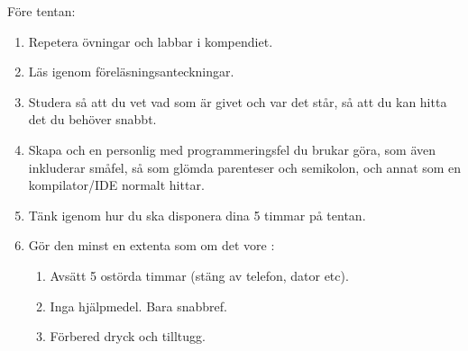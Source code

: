 

\begin{Slide}{Före tentan:}\SlideFontSmall
\begin{enumerate}
\item Repetera övningar och labbar i kompendiet. 
\pause\item Läs igenom föreläsningsanteckningar.
\pause\item Studera   så att du vet vad som är givet och var det står, så att du kan hitta det du behöver snabbt.
\pause\item Skapa och  en personlig  med programmeringsfel du brukar göra, som även inkluderar småfel, så som glömda parenteser och semikolon, och annat som en kompilator/IDE normalt hittar.
\pause\item Tänk igenom hur du ska disponera dina 5 timmar på tentan.
\pause\item Gör den minst en extenta som om det vore : 
\begin{enumerate}\SlideFontTiny
\pause\item Avsätt 5 ostörda timmar (stäng av telefon, dator etc).
\pause\item Inga hjälpmedel. Bara snabbref.
\pause\item Förbered dryck och tilltugg.
\end{enumerate}
\end{enumerate}
\end{Slide}


